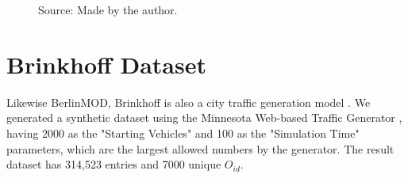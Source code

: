 {\begin{figure}[h!]
\begin{subfigure}[t]{0.48\textwidth}
        \label{fig:tdrive_disks}
    \end{subfigure}
    \footnotesize{Source: Made by the author.}
    \label{fig:tdrive_results2}
\end{figure}

\section{Brinkhoff Dataset}
\label{sec:brinkhoff}
Likewise BerlinMOD, Brinkhoff is also a city traffic generation model \citep{brinkhoffpaper}. We generated a synthetic
dataset using the Minnesota Web-based Traffic Generator \citep{mntg}, having 2000 as the "Starting Vehicles" and 100 as
the "Simulation Time" parameters, which are the largest allowed numbers by the generator. The result dataset has 314,523
entries and 7000 unique $O_{id}$.

}
